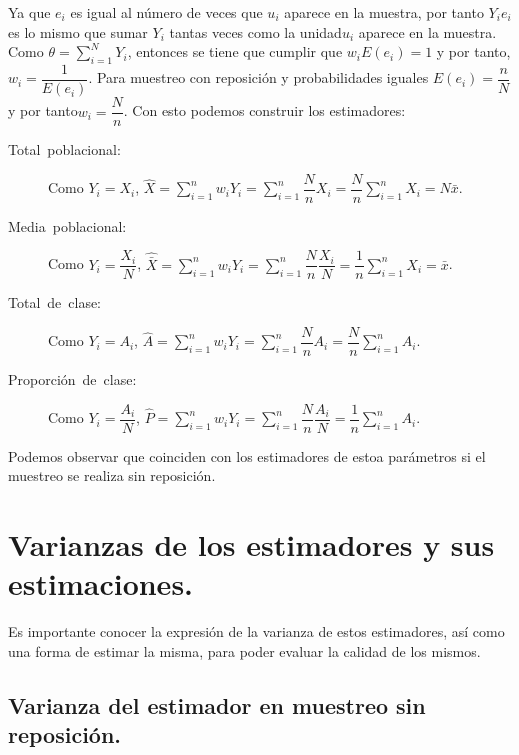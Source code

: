 Ya que $e_{i}$ es igual al n\'umero de veces que $u_{i}$ aparece en
la muestra, por tanto $Y_{i}e_{i}$ es lo mismo que sumar $Y_{i}$
tantas veces como la unidad$u_{i}$ aparece en la muestra. Como $\theta=\sum_{i=1}^{N}Y_{i}$,
entonces se tiene que cumplir que $w_{i}E\left(e_{i}\right)=1$ y
por tanto, $w_{i}=\dfrac{1}{E\left(e_{i}\right)}$. Para muestreo
con reposici\'on y probabilidades iguales $E\left(e_{i}\right)=\dfrac{n}{N}$
y por tanto$w_{i}=\dfrac{N}{n}$. Con esto podemos construir los estimadores:
\begin{description}
\item [{Total~poblacional:}] Como $Y_{i}=X_{i}$, $\hat{X}=\sum_{i=1}^{n}w_{i}Y_{i}=\sum_{i=1}^{n}\dfrac{N}{n}X_{i}=\dfrac{N}{n}\sum_{i=1}^{n}X_{i}=N\bar{x}$.
\item [{Media~poblacional:}] Como $Y_{i}=\dfrac{X_{i}}{N}$, $\hat{\bar{X}}=\sum_{i=1}^{n}w_{i}Y_{i}=\sum_{i=1}^{n}\dfrac{N}{n}\dfrac{X_{i}}{N}=\dfrac{1}{n}\sum_{i=1}^{n}X_{i}=\bar{x}$.
\item [{Total~de~clase:}] Como $Y_{i}=A_{i}$, $\hat{A}=\sum_{i=1}^{n}w_{i}Y_{i}=\sum_{i=1}^{n}\dfrac{N}{n}A_{i}=\dfrac{N}{n}\sum_{i=1}^{n}A_{i}$.
\item [{Proporci\'on~de~clase:}] Como $Y_{i}=\dfrac{A_{i}}{N}$, $\hat{P}=\sum_{i=1}^{n}w_{i}Y_{i}=\sum_{i=1}^{n}\dfrac{N}{n}\dfrac{A_{i}}{N}=\dfrac{1}{n}\sum_{i=1}^{n}A_{i}$.
\end{description}
Podemos observar que coinciden con los estimadores de estoa par\'ametros
si el muestreo se realiza sin reposici\'on.


\section{Varianzas de los estimadores y sus estimaciones.}

Es importante conocer la expresi\'on de la varianza de estos estimadores,
as\'i como una forma de estimar la misma, para poder evaluar la calidad
de los mismos.


\subsection{Varianza del estimador en muestreo sin reposici\'on.}

